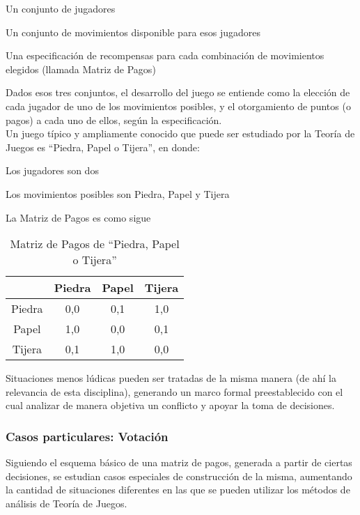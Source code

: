 \documentclass[10pt]{article}
\numberwithin{equation}{section}
\numberwithin{figure}{section}
\numberwithin{table}{section}
\begin{document}
\begin{list}{*}{}
  \item Un conjunto de jugadores
  \item Un conjunto de movimientos disponible para esos jugadores
  \item Una especificación de recompensas para cada combinación de movimientos elegidos (llamada Matriz de Pagos)
\end{list}

Dados esos tres conjuntos, el desarrollo del juego se entiende como la elección de cada jugador de uno de los movimientos posibles, y el otorgamiento de puntos (o pagos) a cada uno de ellos, según la especificación.\\

Un juego típico y ampliamente conocido que puede ser estudiado por la Teoría de Juegos es ``Piedra, Papel o Tijera'', en donde:

\begin{list}{*}{}
  \item Los jugadores son dos
  \item Los movimientos posibles son Piedra, Papel y Tijera
  \item La Matriz de Pagos es como sigue
\end{list}

\begin{table}[h]
\begin{center}
  \begin{tabular}{|c|c|c|c|}
  \hline
  & Piedra & Papel & Tijera \\
  \hline
  Piedra & 0,0 & 0,1 & 1,0 \\ \hline
  Papel & 1,0 & 0,0 & 0,1 \\ \hline
  Tijera & 0,1 & 1,0 & 0,0 \\ \hline
  \end{tabular}
  \caption{Matriz de Pagos de ``Piedra, Papel o Tijera''}
  \end{center}
\end{table}

Situaciones menos lúdicas pueden ser tratadas de la misma manera (de ahí la relevancia de esta disciplina), generando un marco formal preestablecido con el cual analizar de manera objetiva un conflicto y apoyar la toma de decisiones.

\subsubsection{Casos particulares: Votación}
Siguiendo el esquema básico de una matriz de pagos, generada a partir de ciertas decisiones, se estudian casos especiales de construcción de la misma, aumentando la cantidad de situaciones diferentes en las que se pueden utilizar los métodos de análisis de Teoría de Juegos.\\
\end{document}
